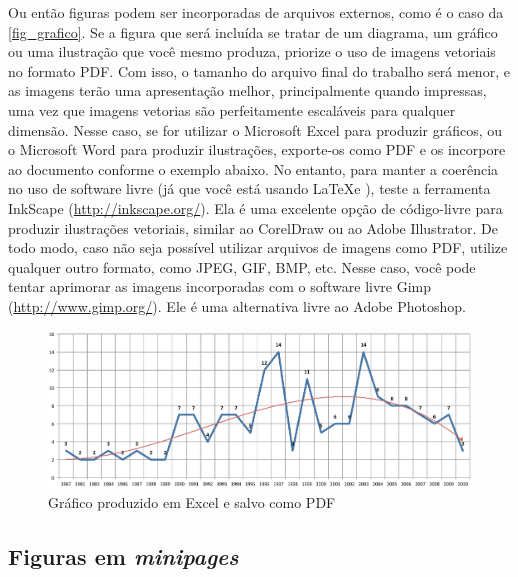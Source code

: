 \documentclass[article,12pt,oneside,a4paper,chapter=TITLE,english,brazil]{abntex2}
\begin{document}
\begin{anexosenv}
Ou então figuras podem ser incorporadas de arquivos externos, como é o caso da \autoref{fig_grafico}. Se a figura que será incluída se tratar de um diagrama, um gráfico ou uma ilustração que você mesmo produza, priorize o uso de imagens vetoriais no formato PDF. Com isso, o tamanho do arquivo final do trabalho será menor, e as imagens terão uma apresentação melhor, principalmente quando impressas, uma vez que imagens vetorias são perfeitamente escaláveis para qualquer dimensão. Nesse caso, se for utilizar o Microsoft Excel para produzir gráficos, ou o Microsoft Word para produzir ilustrações, exporte-os como PDF e os incorpore ao documento conforme o exemplo abaixo. No entanto, para manter a coerência no uso de software livre (já que você está usando \LaTeX e \abnTeX), teste a ferramenta \textsf{InkScape} (\url{http://inkscape.org/}). Ela é uma excelente opção de código-livre para produzir ilustrações vetoriais, similar ao CorelDraw ou ao Adobe Illustrator. De todo modo, caso não seja possível utilizar arquivos de imagens como PDF, utilize qualquer outro formato, como JPEG, GIF, BMP, etc. Nesse caso, você pode tentar aprimorar as imagens incorporadas com o software livre \textsf{Gimp} (\url{http://www.gimp.org/}). Ele é uma alternativa livre ao Adobe Photoshop.
\begin{figure}[htb]
	\caption{\label{fig_grafico}Gráfico produzido em Excel e salvo como PDF}
	\begin{center}
	    \includegraphics[scale=0.5]{figuras/abntex2-modelo-img-grafico.pdf}
	\end{center}
\end{figure}

\subsection{Figuras em \emph{minipages}}


\end{anexosenv}
\end{document}
